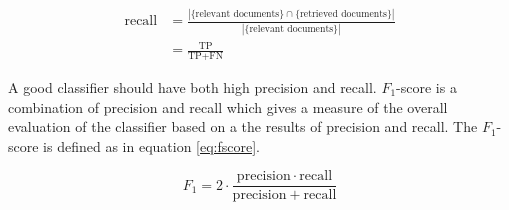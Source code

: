 \begin{equation} \label{eq:recall} 
\begin{split}
\text{recall} & =\frac{|\{\text{relevant documents}\}\cap\{\text{retrieved documents}\}|}{|\{\text{relevant documents}\}|} \\
 & = \frac{\text{TP}}{\text{TP}+\text{FN}}
\end{split}
\end{equation}

A good classifier should have both high precision and recall. $F_{1}$-score is a combination of precision and recall which gives a measure of the overall evaluation of the classifier based on a the results of precision and recall. The $F_{1}$-score is defined as in equation \ref{eq:fscore}.

\begin{equation} \label{eq:fscore}
F_1 = 2 \cdot \frac{\mathrm{precision} \cdot \mathrm{recall}}{\mathrm{precision} + \mathrm{recall}}
\end{equation}






\begin{comment}
Evaluation is the 


Kan også finne: 
p. 330 i iirbook. 
Rand index : measures the RI percentage of decisions that are correct. 
\end{comment}